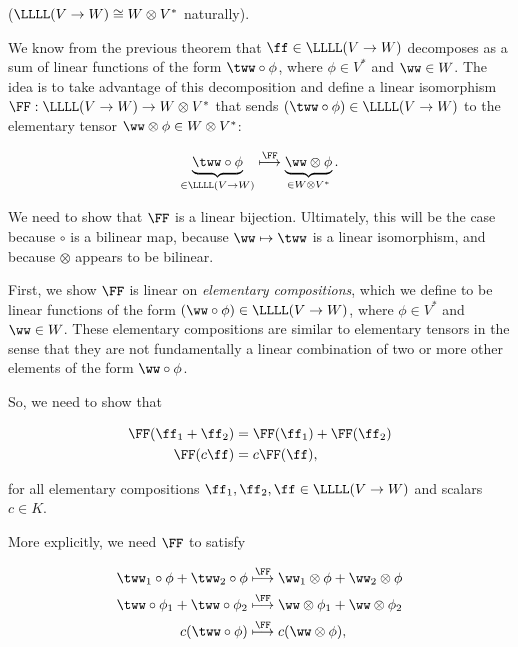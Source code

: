 \begin{deriv}
\label{ch::motivated_intro::deriv::linear_functions_V_W_iso_W_Vstar}
    ($\LLLL(V \rightarrow W) \cong W \otimes V^*$ naturally).
    
    We know from the previous theorem that $\ff \in \LLLL(V \rightarrow W)$ decomposes as a sum of linear functions of the form $\tww \circ \phi$, where $\phi \in V^*$ and $\ww \in W$. The idea is to take advantage of this decomposition and define a linear isomorphism $\FF:\LLLL(V \rightarrow W) \rightarrow W \otimes V^*$ that sends ${(\tww \circ \phi) \in \LLLL(V \rightarrow W)}$ to the elementary tensor $\ww \otimes \phi \in W \otimes V^*$:
    
    \begin{align*}
        \underbrace{\tww \circ \phi}_{\in \LLLL(V \rightarrow W)} \overset{\FF}{\longmapsto} \underbrace{\ww \otimes \phi}_{\in W \otimes V^*}.
    \end{align*}
    
    We need to show that $\FF$ is a linear bijection. Ultimately, this will be the case because $\circ$ is a bilinear map, because $\ww \mapsto \tww$ is a linear isomorphism, and because $\otimes$ appears to be bilinear.
    
    First, we show $\FF$ is linear on \textit{elementary compositions}, which we define to be linear functions of the form $(\ww \circ \phi) \in \LLLL(V \rightarrow W)$, where $\phi \in V^*$ and $\ww \in W$. These elementary compositions are similar to elementary tensors in the sense that they are not fundamentally a linear combination of two or more other elements of the form $\ww \circ \phi$.
    
    So, we need to show that
    
    \begin{align*}
        \FF(\ff_1 + \ff_2) &= \FF(\ff_1) + \FF(\ff_2) \\
        \FF(c\ff) &= c\FF(\ff),
    \end{align*}
    
    for all elementary compositions $\ff_1, \ff_2, \ff \in \LLLL(V \rightarrow W)$ and scalars $c \in K$.
    
    More explicitly, we need $\FF$ to satisfy
    
    \begin{align*}
        \tww_1 \circ \phi + \tww_2 \circ \phi 
        &\overset{\FF}{\longmapsto}
        \ww_1 \otimes \phi + \ww_2 \otimes \phi
        \\
        \tww \circ \phi_1 + \tww \circ \phi_2 
        &\overset{\FF}{\longmapsto}
        \ww \otimes \phi_1 + \ww \otimes \phi_2
        \\
        c (\tww \circ \phi)
        &\overset{\FF}{\longmapsto}
        c (\ww \otimes \phi),
    \end{align*}
    

\end{deriv}
